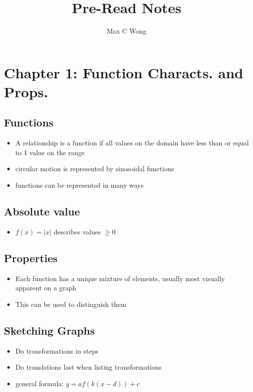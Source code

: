 \documentclass{article}
\begin{document}
\title{Pre-Read Notes}
\author{Max C Wong}
\maketitle

\tableofcontents
\clearpage

    \section{Chapter 1: Function Characts. and Props.}

    \subsection{Functions}
    \begin{itemize}
        \item A relationship is a function if all values on the domain have less than or equal to 1 value on the range
        \item circular motion is represented by sinosoidal functions
        \item functions can be represented in many ways
    \end{itemize}

    \subsection{Absolute value}
    \begin{itemize}
        \item $f(x) = |x|$ describes values $\geq 0$ 
    \end{itemize}

    \subsection{Properties}
    \begin{itemize}
        \item Each function has a unique mixture of elements, usually most visually apparent on a graph
        \item This can be used to distinguish them
    \end{itemize}

    \subsection{Sketching Graphs}
    \begin{itemize}
        \item Do transformations in steps
        \item Do translations last when listing transformations
        \item general formula: $y = af(k(x - d)) + c$
    \end{itemize}
\end{document}
